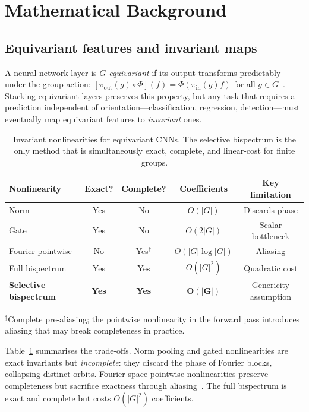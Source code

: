 \documentclass{article}
\theoremstyle{definition}
\theoremstyle{remark}
\theoremstyle{definition}
\begin{document}
\section{Mathematical Background}
\label{sec:background}

\subsection{Equivariant features and invariant maps}

A neural network layer is \emph{$G$-equivariant} if its output transforms
predictably under the group action:
$[\pi_{\mathrm{out}}(g) \circ \Phi](f) = \Phi(\pi_{\mathrm{in}}(g) f)$
for all $g \in G$~\citep{cohen2016group, weiler2019general}.
Stacking equivariant layers preserves this property, but any task that requires
a prediction independent of orientation---classification, regression,
detection---must eventually map equivariant features to \emph{invariant} ones.

\begin{table}[t]
  \caption{Invariant nonlinearities for equivariant CNNs. The selective
    bispectrum is the only method that is simultaneously exact, complete,
    and linear-cost for finite groups.}
  \label{tab:nonlinearity-comparison}
  \centering
  \small
  \begin{tabular}{lcccc}
    \toprule
    Nonlinearity & Exact? & Complete? & Coefficients & Key limitation \\
    \midrule
    Norm          & Yes & No  & $O(|G|)$      & Discards phase \\
    Gate          & Yes & No  & $O(2|G|)$     & Scalar bottleneck \\
    Fourier pointwise & No & Yes$^\ddagger$ & $O(|G| \log |G|)$ & Aliasing \\
    Full bispectrum & Yes & Yes & $O(|G|^2)$  & Quadratic cost \\
    \midrule
    \textbf{Selective bispectrum} & \textbf{Yes} & \textbf{Yes}
      & $\mathbf{O(|G|)}$ & Genericity assumption \\
    \bottomrule
  \end{tabular}

  \vspace{0.3em}
  {\small $^\ddagger$Complete pre-aliasing; the pointwise nonlinearity in the forward pass introduces aliasing that may break completeness in practice.}
\end{table}

Table~\ref{tab:nonlinearity-comparison} summarises the trade-offs. Norm
pooling and gated nonlinearities are exact invariants but \emph{incomplete}:
they discard the phase of Fourier blocks, collapsing distinct orbits.
Fourier-space pointwise nonlinearities preserve completeness but
sacrifice exactness through aliasing~\citep{weiler2019general}. The full
bispectrum is exact and complete but costs $O(|G|^2)$ coefficients.
\end{document}

